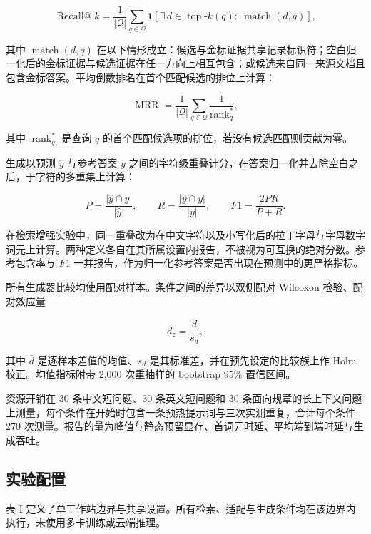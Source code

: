 \documentclass{article}
\DeclareMathOperator{\rank}{rank}
\begin{document}
\begin{equation}
\operatorname{Recall@}k=\frac{1}{|\mathcal{Q}|}\sum_{q\in\mathcal{Q}}
\mathbf{1}\!\left[\exists\, d\in \operatorname{top}\text{-}k(q):\ \operatorname{match}(d,q)\right],
\end{equation}

其中 $\operatorname{match}(d,q)$ 在以下情形成立：候选与金标证据共享记录标识符；空白归一化后的金标证据与候选证据在任一方向上相互包含；或候选来自同一来源文档且包含金标答案。平均倒数排名在首个匹配候选的排位上计算：

\begin{equation}
\operatorname{MRR}=\frac{1}{|\mathcal{Q}|}\sum_{q\in\mathcal{Q}}\frac{1}{\rank_q^{*}},
\end{equation}

其中 $\rank_q^{*}$ 是查询 $q$ 的首个匹配候选项的排位，若没有候选匹配则贡献为零。

生成以预测 $\hat{y}$ 与参考答案 $y$ 之间的字符级重叠计分，在答案归一化并去除空白之后，于字符的多重集上计算：

\begin{equation}
P=\frac{|\hat{y}\cap y|}{|\hat{y}|},\qquad
R=\frac{|\hat{y}\cap y|}{|y|},\qquad
F1=\frac{2PR}{P+R}.
\end{equation}

在检索增强实验中，同一重叠改为在中文字符以及小写化后的拉丁字母与字母数字词元上计算。两种定义各自在其所属设置内报告，不被视为可互换的绝对分数。参考包含率与 $F1$ 一并报告，作为归一化参考答案是否出现在预测中的更严格指标。

所有生成器比较均使用配对样本。条件之间的差异以双侧配对 Wilcoxon 检验、配对效应量

\begin{equation}
d_z=\frac{\bar{d}}{s_d},
\end{equation}

其中 $\bar{d}$ 是逐样本差值的均值、$s_d$ 是其标准差，并在预先设定的比较族上作 Holm 校正。均值指标附带 2{,}000 次重抽样的 bootstrap 95\% 置信区间。

资源开销在 30 条中文短问题、30 条英文短问题和 30 条面向规章的长上下文问题上测量，每个条件在开始时包含一条预热提示词与三次实测重复，合计每个条件 270 次测量。报告的量为峰值与静态预留显存、首词元时延、平均端到端时延与生成吞吐。

\subsection{实验配置}

表 I 定义了单工作站边界与共享设置。所有检索、适配与生成条件均在该边界内执行，未使用多卡训练或云端推理。
\end{document}
